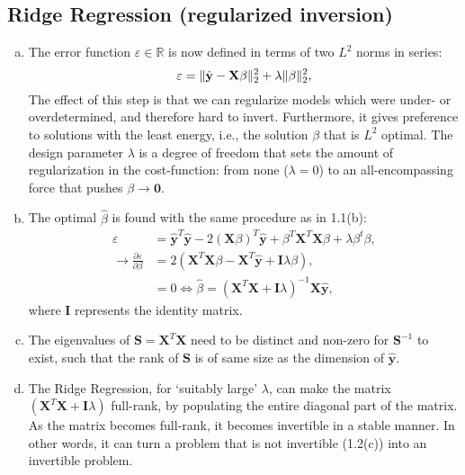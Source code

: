 \documentclass{article}
\DeclarePairedDelimiter\norm{\lVert}{\rVert}%
\begin{document}
\subsection{Ridge Regression (regularized inversion)}
\begin{enumerate}[(a)]
    \item The error function $\varepsilon\in\mathbb{R}$ is now defined in terms of two $L^2$ norms in series:
    \begin{equation}
        \varepsilon=\norm{\hat{\mathbf{y}}-\mathbf{X}\beta}_2^2 + \lambda\norm{\beta}_2^2,
    \end{equation}
    The effect of this step is that we can regularize models which were under- or overdetermined, and therefore hard to invert. Furthermore, it gives preference to solutions with the least energy, i.e., the solution $\beta$ that is $L^2$ optimal. The design parameter $\lambda$ is a degree of freedom that sets the amount of regularization in the cost-function: from none ($\lambda=0$) to an all-encompassing force that pushes $\beta\to\mathbf{0}$.
    \item The optimal $\hat{\beta}$ is found with the same procedure as in 1.1(b):
    \begin{align}
        \varepsilon & = \hat{\mathbf{y}}^T\hat{\mathbf{y}} - 2 (\mathbf{X}\beta)^T\hat{\mathbf{y}} + \beta^T\mathbf{X}^T\mathbf{X}\beta + \lambda\beta^t\beta,\\
        \to \frac{\partial\varepsilon}{\partial\beta} & = 2(\mathbf{X}^T\mathbf{X}\beta - \mathbf{X}^T\hat{\mathbf{y}}+\mathbf{I}\lambda\beta),\\
        & = 0 \Longleftrightarrow \hat{\beta} = (\mathbf{X}^T\mathbf{X}+\mathbf{I}\lambda)^{-1}\mathbf{X}\hat{\mathbf{y}},
    \end{align}
    where $\mathbf{I}$ represents the identity matrix.
    \item The eigenvalues of $\mathbf{S}=\mathbf{X}^T\mathbf{X}$ need to be distinct and non-zero for $\mathbf{S}^{-1}$ to exist, such that the rank of $\mathbf{S}$ is of same size as the dimension of $\hat{\mathbf{y}}$. 
    \item The Ridge Regression, for `suitably large' $\lambda$, can make the matrix $(\mathbf{X}^T\mathbf{X}+\mathbf{I}\lambda)$ full-rank, by populating the entire diagonal part of the matrix. As the matrix becomes full-rank, it becomes invertible in a stable manner. In other words, it can turn a problem that is not invertible (1.2(c)) into an invertible problem.
\end{enumerate}
\end{document}
